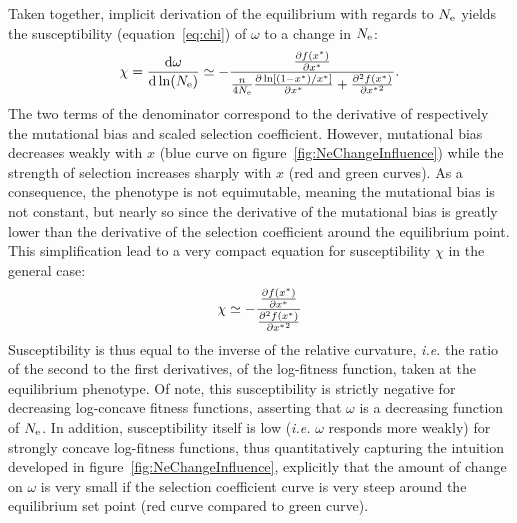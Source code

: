 Taken together, implicit derivation of the equilibrium with regards to $N_{\mathrm{e}}$ yields the susceptibility (equation~\ref{eq:chi}) of $\omega$ to a change in $N_{\mathrm{e}}$:
\begin{gather}
    \chi = \frac{ \mathrm{d} \omega}{\mathrm{d} \ln (N_{\mathrm{e}})} \simeq - \frac{\frac{ \partial f (x^{*}) }{\partial {x^{*}}}}{\frac{n}{4 N_{\mathrm{e}}} \frac{\partial \ln [ (1 - x^{*}) / x^{*} ]}{\partial x^{*} } + \frac{ \partial^2 f (x^{*}) }{\partial {x^{*}}^2}}.
\end{gather}
The two terms of the denominator correspond to the derivative of respectively the mutational bias and scaled selection coefficient.
However, mutational bias decreases weakly with $x$ (blue curve on figure~\ref{fig:NeChangeInfluence}) while the strength of selection increases sharply with $x$ (red and green curves).
As a consequence, the phenotype is not equimutable, meaning the mutational bias is not constant, but nearly so since the derivative of the mutational bias is greatly lower than the derivative of the selection coefficient around the equilibrium point.
This simplification lead to a very compact equation for susceptibility $\chi$ in the general case:
\begin{gather}
    \chi \simeq - \frac{\frac{ \partial f (x^{*}) }{\partial {x^{*}}}}{\frac{ \partial^2 f (x^{*}) }{\partial {x^{*}}^2}}
\end{gather}
Susceptibility is thus equal to the inverse of the relative curvature, \textit{i.e.} the ratio of the second to the first derivatives, of the log-fitness function, taken at the equilibrium phenotype.
Of note, this susceptibility is strictly negative for decreasing log-concave fitness functions, asserting that $\omega$ is a decreasing function of $N_{\mathrm{e}}$.
In addition, susceptibility itself is low (\textit{i.e.} $\omega$ responds more weakly) for strongly concave log-fitness functions, thus quantitatively capturing the intuition developed in figure~\ref{fig:NeChangeInfluence}, explicitly that the amount of change on $\omega$ is very small if the selection coefficient curve is very steep around the equilibrium set point (red curve compared to green curve).

